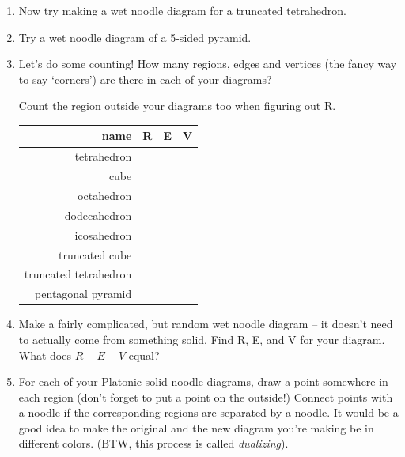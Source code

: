 \begin{enumerate}
    \wbvfill
    
    \item Now try making a wet noodle diagram for a truncated tetrahedron.
    
    \wbvfill
    
    \wbnewpage
    
    \item Try a wet noodle diagram of a 5-sided pyramid.
    
    \wbvfill
    
    \item Let's do some counting!  How many regions, edges and vertices (the fancy way to say `corners') are there in each of your diagrams?
    \bigskip
    
    Count the region outside your diagrams too when figuring out R.
    \bigskip
    
    \begin{tabular}{|r|c|c|c|}
    \strut name & R & E & V \\\hline
    \bigstrut tetrahedron & & & \\ \hline
    \bigstrut cube & & & \\ \hline
    \bigstrut octahedron & & & \\ \hline
    \bigstrut dodecahedron & & & \\ \hline
    \bigstrut icosahedron & & & \\ \hline
    \bigstrut truncated cube & & & \\ \hline
    \bigstrut truncated tetrahedron & & & \\ \hline
    \bigstrut pentagonal pyramid & & & \\ \hline
    \end{tabular}
\bigskip

    \item Make a fairly complicated, but random wet noodle diagram -- it doesn't need to actually come from something solid.  Find R, E, and V for your diagram.  What does $R-E+V$ equal?
    
    \wbvfill
    
   
   \wbnewpage
   
   \item For each of your Platonic solid noodle diagrams, draw a point somewhere in each region (don't forget to put a point on the outside!)  Connect points with a noodle if the corresponding regions are separated by a noodle.  It would be a good idea to make the original and the new diagram you're making be in different colors.  (BTW, this process is called {\em dualizing}).
   
   \wbvfill
   
\end{enumerate}


